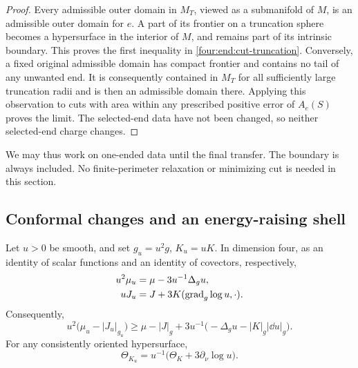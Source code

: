 \begin{proof}
Every admissible outer domain in \(M_T\), viewed as a submanifold of
\(M\), is an admissible outer domain for \(e\). A part of its frontier
on a truncation sphere becomes a hypersurface in the interior of \(M\),
and remains part of its intrinsic boundary. This proves the first
inequality in \eqref{four:end:cut-truncation}. Conversely, a fixed original
admissible domain has compact frontier and contains no tail of any
unwanted end. It is consequently contained in \(M_T\) for all
sufficiently large truncation radii and is then an admissible domain
there. Applying this observation to cuts with area within any prescribed
positive error of \(A_e(S)\) proves the limit. The selected-end data have
not been changed, so neither selected-end charge changes.
\end{proof}

We may thus work on one-ended data until the final transfer. The boundary
is always included. No finite-perimeter relaxation or minimizing cut is
needed in this section.

\subsection{Conformal changes and an energy-raising shell}

\begin{lemma}\label{four:lem:conformal}
Let \(u>0\) be smooth, and set \(g_u=u^2g\), \(K_u=uK\). In dimension
four, as an identity of scalar functions and an identity of covectors,
respectively,
\begin{align}
 u^2\mu_u&=\mu-3u^{-1}\Delta_g u,\label{four:end:conformal-mu}\\
 uJ_u&=J+3K(\operatorname{grad}_g\log u,\cdot).\label{four:end:conformal-J}
\end{align}
Consequently,
\begin{equation}\label{four:end:conformal-dec}
 u^2\bigl(\mu_u-|J_u|_{g_u}\bigr)
 \ge \mu-|J|_g+3u^{-1}
          \bigl(-\Delta_g u-|K|_g|\dd u|_g\bigr).
\end{equation}
For any consistently oriented hypersurface,
\begin{equation}\label{four:end:conformal-expansion}
 \Theta_{K_u}=u^{-1}
       \bigl(\Theta_K+3\partial_\nu\log u\bigr).
\end{equation}
\end{lemma}

